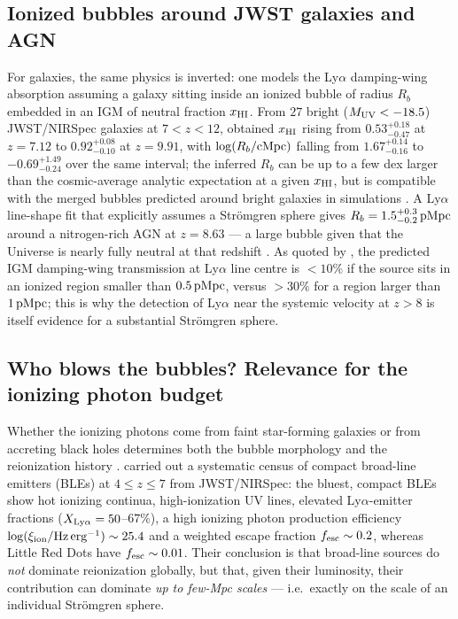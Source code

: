\documentclass[11pt,a4paper]{article}
\newcommand{\pMpc}{\,{\rm pMpc}}
\begin{document}
\subsection{Ionized bubbles around JWST galaxies and AGN}
For galaxies, the same physics is inverted: one models the Ly$\alpha$ damping-wing absorption
assuming a galaxy sitting inside an ionized bubble of radius $R_b$ embedded in an IGM of neutral
fraction $x_{\rm HI}$. From $27$ bright ($M_{\rm UV}<-18.5$) JWST/NIRSpec galaxies at $7<z<12$,
\citet{Umeda2023} obtained $x_{\rm HI}$ rising from $0.53^{+0.18}_{-0.47}$ at $z=7.12$ to
$0.92^{+0.08}_{-0.10}$ at $z=9.91$, with $\log(R_b/{\rm cMpc})$ falling from $1.67^{+0.14}_{-0.16}$
to $-0.69^{+1.49}_{-0.24}$ over the same interval; the inferred $R_b$ can be up to a few dex larger
than the cosmic-average analytic expectation at a given $x_{\rm HI}$, but is compatible with the
merged bubbles predicted around bright galaxies in simulations \citep{Umeda2023}. A Ly$\alpha$
line-shape fit that explicitly assumes a Str\"omgren sphere gives $R_b=1.5^{+0.3}_{-0.2}\pMpc$ around
a nitrogen-rich AGN at $z=8.63$ --- a large bubble given that the Universe is nearly fully neutral at
that redshift \citep{Morishita2025}. As quoted by \citet{Morishita2025}, the predicted IGM damping-wing transmission at Ly$\alpha$ line
centre is $<10\%$ if the source sits in an ionized region smaller than $0.5\pMpc$, versus $>30\%$ for
a region larger than $1\pMpc$; this is why the detection of Ly$\alpha$ near the systemic velocity at
$z>8$ is itself evidence for a substantial Str\"omgren sphere.

\subsection{Who blows the bubbles? Relevance for the ionizing photon budget}
Whether the ionizing photons come from faint star-forming galaxies or from accreting black holes
determines both the bubble morphology and the reionization history
\citep{Chakraborty2025,Gnedin2022}. \citet{Mascia2026} carried out a systematic census of compact
broad-line emitters (BLEs) at $4\le z\le7$ from JWST/NIRSpec: the bluest, compact BLEs show hot
ionizing continua, high-ionization UV lines, elevated Ly$\alpha$-emitter fractions
($X_{\rm Ly\alpha}=50$--$67\%$), a high ionizing photon production efficiency
$\log(\xi_{\rm ion}/{\rm Hz\,erg^{-1}})\sim25.4$ and a weighted escape fraction
$f_{\rm esc}\sim0.2$, whereas Little Red Dots have $f_{\rm esc}\sim0.01$. Their conclusion is that
broad-line sources do \emph{not} dominate reionization globally, but that, given their luminosity,
their contribution can dominate \emph{up to few-Mpc scales} \citep{Mascia2026} --- i.e.\ exactly on
the scale of an individual Str\"omgren sphere.
\end{document}

